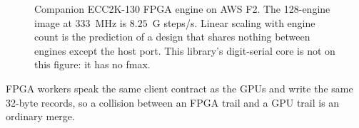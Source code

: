 \begin{figure}[t]
\centering
{}
\caption{Companion ECC2K-130 FPGA engine on AWS F2. The 128-engine
  image at $333$~MHz is $8.25$~G steps/s. Linear scaling with engine
  count is the prediction of a design that shares nothing between
  engines except the host port. This library's digit-serial core is
  not on this figure: it has no fmax.}
\label{fig:fpga}
\end{figure}

FPGA workers speak the same client contract as the GPUs and write the
same 32-byte records, so a collision between an FPGA trail and a GPU
trail is an ordinary merge.

